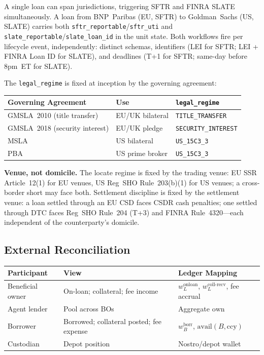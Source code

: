 \documentclass[11pt,a4paper]{article}
\begin{document}
A single loan can span jurisdictions, triggering SFTR and FINRA SLATE simultaneously. A loan from BNP~Paribas (EU, SFTR) to Goldman~Sachs (US, SLATE) carries both \texttt{sftr\_reportable}\slash\allowbreak\texttt{sftr\_uti} and\allowbreak{} \texttt{slate\_reportable}\slash\allowbreak\texttt{slate\_loan\_id} in the unit state. Both workflows fire per lifecycle event, independently: distinct schemas, identifiers (LEI for SFTR; LEI + FINRA Loan ID for SLATE), and deadlines (T+1 for SFTR; same-day before 8pm~ET for SLATE).

The \texttt{legal\_regime} is fixed at inception by the governing agreement:

\begin{center}\small
\begin{tabular}{l l l}
\toprule
\textbf{Governing Agreement} & \textbf{Use} & \textbf{\texttt{legal\_regime}} \\
\midrule
GMSLA~2010 (title transfer) & EU/UK bilateral & \texttt{TITLE\_TRANSFER} \\
GMSLA~2018 (security interest) & EU/UK pledge & \texttt{SECURITY\_INTEREST} \\
MSLA & US bilateral & \texttt{US\_15C3\_3} \\
PBA & US prime broker & \texttt{US\_15C3\_3} \\
\bottomrule
\end{tabular}
\end{center}

\noindent\textbf{Venue, not domicile.} The locate regime is fixed by the trading venue: EU SSR Article~12(1) for EU venues, US Reg~SHO Rule~203(b)(1) for US venues; a cross-border short may face both. Settlement discipline is fixed by the settlement venue: a loan settled through an EU CSD faces CSDR cash penalties; one settled through DTC faces Reg~SHO Rule~204 (T+3) and FINRA Rule~4320---each independent of the counterparty's domicile.

\subsection{External Reconciliation}
\label{sec:sbl-external}

\begin{center}
\small
\begin{tabular}{l p{4.5cm} p{3.5cm}}
\toprule
\textbf{Participant} & \textbf{View} & \textbf{Ledger Mapping} \\
\midrule
Beneficial owner & On-loan; collateral; fee income & $w^{\mathrm{onloan}}_L$, $w^{\mathrm{coll\text{-}recv}}_L$, fee accrual \\
Agent lender & Pool across BOs & Aggregate $\mathrm{own}$ \\
Borrower & Borrowed; collateral posted; fee expense & $w^{\mathrm{borr}}_B$, $\mathrm{avail}(B,\mathrm{ccy})$ \\
Custodian & Depot position & Nostro/depot wallet \\
\bottomrule
\end{tabular}
\end{center}
\end{document}
